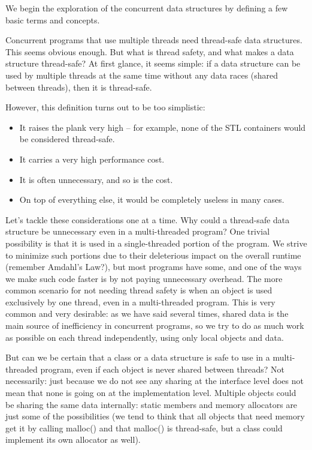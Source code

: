 We begin the exploration of the concurrent data structures by defining a few basic terms and concepts.


Concurrent programs that use multiple threads need thread-safe data structures. This seems obvious enough. But what is thread safety, and what makes a data structure thread-safe? At first glance, it seems simple: if a data structure can be used by multiple threads at the same time without any data races (shared between threads), then it is thread-safe.

However, this definition turns out to be too simplistic:

\begin{itemize}
\item It raises the plank very high – for example, none of the STL containers would be considered thread-safe.
\item It carries a very high performance cost.
\item It is often unnecessary, and so is the cost.
\item On top of everything else, it would be completely useless in many cases.
\end{itemize}

Let's tackle these considerations one at a time. Why could a thread-safe data structure be unnecessary even in a multi-threaded program? One trivial possibility is that it is used in a single-threaded portion of the program. We strive to minimize such portions due to their deleterious impact on the overall runtime (remember Amdahl's Law?), but most programs have some, and one of the ways we make such code faster is by not paying unnecessary overhead. The more common scenario for not needing thread safety is when an object is used exclusively by one thread, even in a multi-threaded program. This is very common and very desirable: as we have said several times, shared data is the main source of inefficiency in concurrent programs, so we try to do as much work as possible on each thread independently, using only local objects and data.

But can we be certain that a class or a data structure is safe to use in a multi-threaded program, even if each object is never shared between threads? Not necessarily: just because we do not see any sharing at the interface level does not mean that none is going on at the implementation level. Multiple objects could be sharing the same data internally: static members and memory allocators are just some of the possibilities (we tend to think that all objects that need memory get it by calling malloc() and that malloc() is thread-safe, but a class could implement its own allocator as well).

